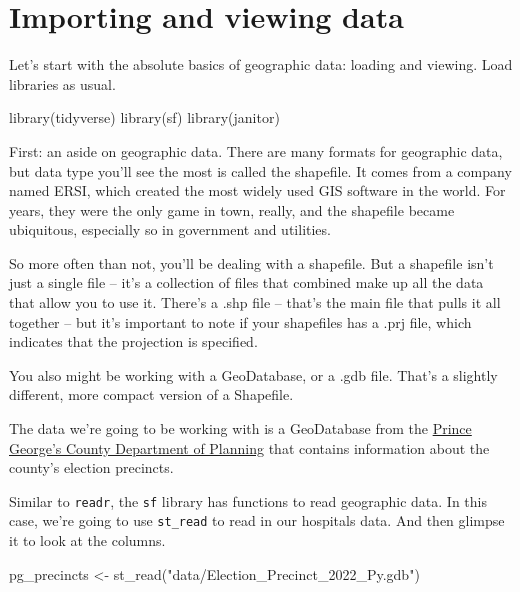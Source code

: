 \documentclass[
  letterpaper,
  DIV=11,
  numbers=noendperiod]{scrreprt}
\newenvironment{Shaded}{\begin{snugshade}}{\end{snugshade}}
\newcommand{\FunctionTok}[1]{\textcolor[rgb]{0.28,0.35,0.67}{#1}}
\newcommand{\NormalTok}[1]{\textcolor[rgb]{0.00,0.23,0.31}{#1}}
\newcommand{\OtherTok}[1]{\textcolor[rgb]{0.00,0.23,0.31}{#1}}
\newcommand{\StringTok}[1]{\textcolor[rgb]{0.13,0.47,0.30}{#1}}
\begin{document}
\hypertarget{importing-and-viewing-data}{%
\section{Importing and viewing data}\label{importing-and-viewing-data}}

Let's start with the absolute basics of geographic data: loading and
viewing. Load libraries as usual.

\begin{Shaded}
\begin{Highlighting}[]
\FunctionTok{library}\NormalTok{(tidyverse)}
\FunctionTok{library}\NormalTok{(sf)}
\FunctionTok{library}\NormalTok{(janitor)}
\end{Highlighting}
\end{Shaded}

First: an aside on geographic data. There are many formats for
geographic data, but data type you'll see the most is called the
shapefile. It comes from a company named ERSI, which created the most
widely used GIS software in the world. For years, they were the only
game in town, really, and the shapefile became ubiquitous, especially so
in government and utilities.

So more often than not, you'll be dealing with a shapefile. But a
shapefile isn't just a single file -- it's a collection of files that
combined make up all the data that allow you to use it. There's a .shp
file -- that's the main file that pulls it all together -- but it's
important to note if your shapefiles has a .prj file, which indicates
that the projection is specified.

You also might be working with a GeoDatabase, or a .gdb file. That's a
slightly different, more compact version of a Shapefile.

The data we're going to be working with is a GeoDatabase from the
\href{https://gisdata.pgplanning.org/opendata/}{Prince George's County
Department of Planning} that contains information about the county's
election precincts.

Similar to \texttt{readr}, the \texttt{sf} library has functions to read
geographic data. In this case, we're going to use \texttt{st\_read} to
read in our hospitals data. And then glimpse it to look at the columns.

\begin{Shaded}
\begin{Highlighting}[]
\NormalTok{pg\_precincts }\OtherTok{\textless{}{-}} \FunctionTok{st\_read}\NormalTok{(}\StringTok{"data/Election\_Precinct\_2022\_Py.gdb"}\NormalTok{)}
\end{Highlighting}
\end{Shaded}
\end{document}

